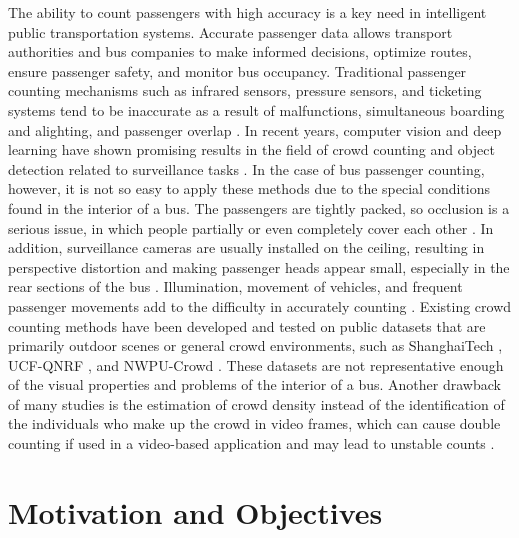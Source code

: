The ability to count passengers with high accuracy is a key need in intelligent public transportation systems. Accurate passenger data allows transport authorities and bus companies to make informed decisions, optimize routes, ensure passenger safety, and monitor bus occupancy. Traditional passenger counting mechanisms such as infrared sensors, pressure sensors, and ticketing systems tend to be inaccurate as a result of malfunctions, simultaneous boarding and alighting, and passenger overlap \cite{Aleksander2024}. In recent years, computer vision and deep learning have shown promising results in the field of crowd counting and object detection related to surveillance tasks \cite{sindagi2022survey}. In the case of bus passenger counting, however, it is not so easy to apply these methods due to the special conditions found in the interior of a bus. The passengers are tightly packed, so occlusion is a serious issue, in which people partially or even completely cover each other \cite{sundararaman2021}. In addition, surveillance cameras are usually installed on the ceiling, resulting in perspective distortion and making passenger heads appear small, especially in the rear sections of the bus \cite{rapid2020}. Illumination, movement of vehicles, and frequent passenger movements add to the difficulty in accurately counting \cite{Claire2021}. Existing crowd counting methods have been developed and tested on public datasets that are primarily outdoor scenes or general crowd environments, such as ShanghaiTech \cite{Zhu2020}, UCF-QNRF \cite{ucf_qnrf_dataset}, and NWPU-Crowd \cite{wang2020nwpu}. These datasets are not representative enough of the visual properties and problems of the interior of a bus. Another drawback of many studies is the estimation of crowd density instead of the identification of the individuals who make up the crowd in video frames, which can cause double counting if used in a video-based application and may lead to unstable counts \cite{hassan2023crowd}.

\section{Motivation and Objectives}

